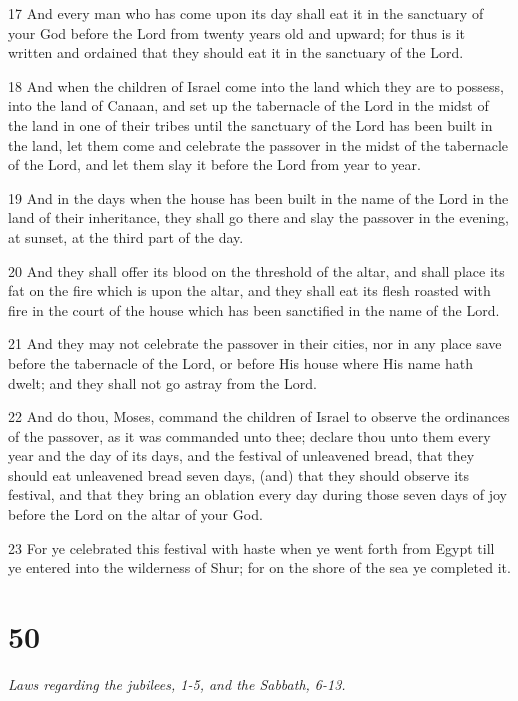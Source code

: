 \par 17 And every man who has come upon its day shall eat it in the sanctuary of your God before the Lord from twenty years old and upward; for thus is it written and ordained that they should eat it in the sanctuary of the Lord.
\par 18 And when the children of Israel come into the land which they are to possess, into the land of Canaan, and set up the tabernacle of the Lord in the midst of the land in one of their tribes until the sanctuary of the Lord has been built in the land, let them come and celebrate the passover in the midst of the tabernacle of the Lord, and let them slay it before the Lord from year to year.
\par 19 And in the days when the house has been built in the name of the Lord in the land of their inheritance, they shall go there and slay the passover in the evening, at sunset, at the third part of the day.
\par 20 And they shall offer its blood on the threshold of the altar, and shall place its fat on the fire which is upon the altar, and they shall eat its flesh roasted with fire in the court of the house which has been sanctified in the name of the Lord.
\par 21 And they may not celebrate the passover in their cities, nor in any place save before the tabernacle of the Lord, or before His house where His name hath dwelt; and they shall not go astray from the Lord.
\par 22 And do thou, Moses, command the children of Israel to observe the ordinances of the passover, as it was commanded unto thee; declare thou unto them every year and the day of its days, and the festival of unleavened bread, that they should eat unleavened bread seven days, (and) that they should observe its festival, and that they bring an oblation every day during those seven days of joy before the Lord on the altar of your God.
\par 23 For ye celebrated this festival with haste when ye went forth from Egypt till ye entered into the wilderness of Shur; for on the shore of the sea ye completed it.

\chapter{50}

\par \textit{Laws regarding the jubilees, 1-5, and the Sabbath, 6-13.}

